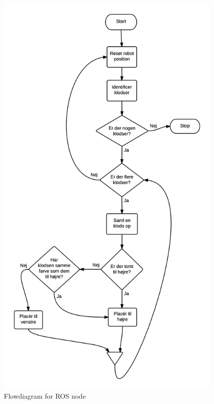 \begin{figure}
	\centering
	\includegraphics[scale=.7]{images/node-flow}
	\caption{Flowdiagram for ROS node}
	\label{fig:node-flow}
\end{figure}